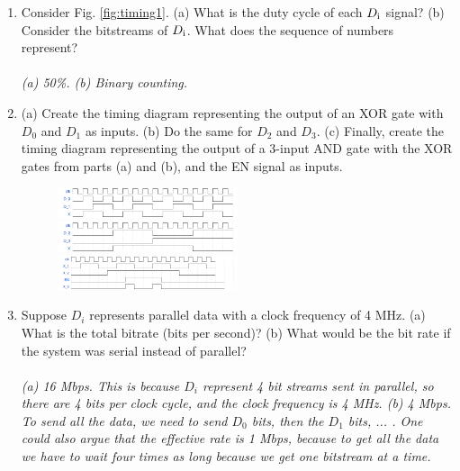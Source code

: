 \documentclass[10pt]{article}
\begin{document}
\begin{enumerate}
\item Consider Fig. \ref{fig:timing1}. (a) What is the duty cycle of each $D_{\rm i}$ signal? (b) Consider the bitstreams of $D_{\rm i}$.  What does the sequence of numbers represent? \\ \\
\textit{(a) 50\%. (b) Binary counting.}
\item (a) Create the timing diagram representing the output of an XOR gate with $D_0$ and $D_1$ as inputs. (b) Do the same for $D_2$ and $D_3$.  (c) Finally, create the timing diagram representing the output of a 3-input AND gate with the XOR gates from parts (a) and (b), and the EN signal as inputs. \\
\begin{figure}[hb]
\centering
\includegraphics[width=0.5\textwidth]{timing_1.png} \\ \vspace{0.5cm}
\includegraphics[width=0.5\textwidth]{timing_2.png} \\ \vspace{0.5cm}
\includegraphics[width=0.5\textwidth]{timing_3.png}
\end{figure}
\item Suppose $D_i$ represents parallel data with a clock frequency of 4 MHz.  (a) What is the total bitrate (bits per second)?  (b) What would be the bit rate if the system was serial instead of parallel? \\ \\
\textit{(a) 16 Mbps. This is because $D_i$ represent 4 bit streams sent in parallel, so there are 4 bits per clock cycle, and the clock frequency is 4 MHz.  (b) 4 Mbps.  To send all the data, we need to send $D_0$ bits, then the $D_1$ bits, ... .  One could also argue that the effective rate is 1 Mbps, because to get all the data we have to wait four times as long because we get one bitstream at a time.}
\end{enumerate}
\end{document}
